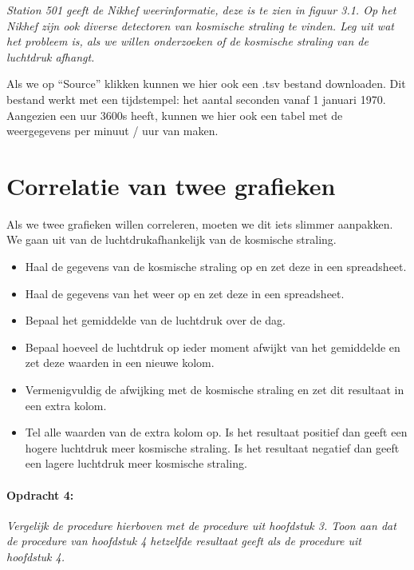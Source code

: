 \emph{Station 501 geeft de Nikhef weerinformatie, deze is te zien in
figuur 3.1. Op het Nikhef zijn ook diverse detectoren van kosmische
straling te vinden. Leg uit wat het probleem is, als we willen onderzoeken
of de kosmische straling van de luchtdruk afhangt.}

Als we op ``Source'' klikken kunnen we hier ook een .tsv bestand
downloaden. Dit bestand werkt met een tijdstempel: het aantal seconden
vanaf 1 januari 1970. Aangezien een uur 3600s heeft, kunnen we hier
ook een tabel met de weergegevens per minuut / uur van maken.


\section{Correlatie van twee grafieken}

Als we twee grafieken willen correleren, moeten we dit iets slimmer
aanpakken. We gaan uit van de luchtdrukafhankelijk van de kosmische
straling.
\begin{itemize}
\item Haal de gegevens van de kosmische straling op en zet deze in een spreadsheet.
\item Haal de gegevens van het weer op en zet deze in een spreadsheet.
\item Bepaal het gemiddelde van de luchtdruk over de dag.
\item Bepaal hoeveel de luchtdruk op ieder moment afwijkt van het gemiddelde
en zet deze waarden in een nieuwe kolom.
\item Vermenigvuldig de afwijking met de kosmische straling en zet dit resultaat
in een extra kolom.
\item Tel alle waarden van de extra kolom op. Is het resultaat positief
dan geeft een hogere luchtdruk meer kosmische straling. Is het resultaat
negatief dan geeft een lagere luchtdruk meer kosmische straling.
\end{itemize}

\paragraph*{Opdracht 4:}

\emph{Vergelijk de procedure hierboven met de procedure uit hoofdstuk
3. Toon aan dat de procedure van hoofdstuk 4 hetzelfde resultaat geeft
als de procedure uit hoofdstuk 4.}



